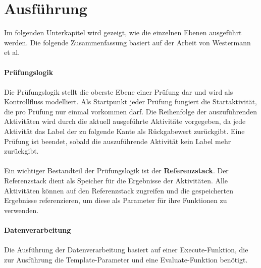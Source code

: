     \section{Ausführung}
    Im folgenden Unterkapitel wird gezeigt, wie die einzelnen Ebenen ausgeführt werden.
    Die folgende Zusammenfassung basiert auf der Arbeit von Westermann et al.\\
    \\
    \textbf{Prüfungslogik}\\
    \\
    Die Prüfungslogik stellt die oberste Ebene einer Prüfung dar und wird als Kontrollfluss modelliert.
    Als Startpunkt jeder Prüfung fungiert die Startaktivität, die pro Prüfung nur einmal vorkommen darf.
    Die Reihenfolge der auszuführenden Aktivitäten wird durch die aktuell ausgeführte Aktivitäte vorgegeben, da jede Aktivität das Label der zu folgende Kante als Rückgabewert zurückgibt.
    Eine Prüfung ist beendet, sobald die auszuführende Aktivität kein Label mehr zurückgibt.\\
    \\
    Ein wichtiger Bestandteil der Prüfungslogik ist der \textbf{Referenzstack}. Der Referenzstack dient als Speicher für die Ergebnisse der Aktivitäten.
    Alle Aktivitäten können auf den Referenzstack zugreifen und die gespeicherten Ergebnisse referenzieren, um diese als Parameter für ihre Funktionen zu verwenden.\\
    \\
    \textbf{Datenverarbeitung}\\
    \\
    Die Ausführung der Datenverarbeitung basiert auf einer Execute-Funktion, die zur Ausführung die Template-Parameter und eine Evaluate-Funktion benötigt.
